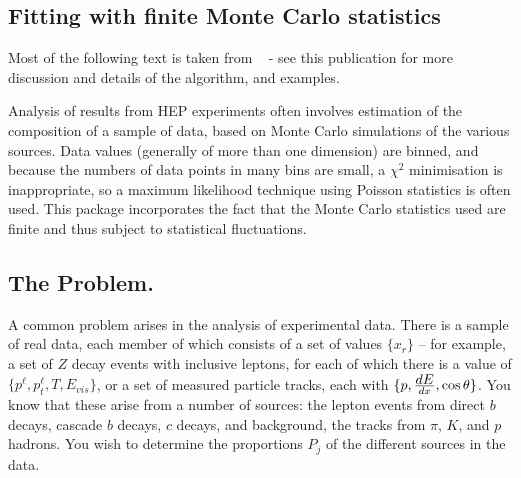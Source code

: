 \begin{changebar}
\section{Fitting with finite Monte Carlo statistics}
 
Most of the following text is taken from ~\cite{bib-FINITEMC} - see this
publication for more discussion and details of the algorithm, and examples.
 
Analysis of results from HEP experiments often involves
estimation of the composition of a sample of data,
based on Monte Carlo simulations of the various sources.
Data values (generally of more than one dimension) are binned, and
because the numbers of data points in many bins are small, a $\chi^2$
minimisation is inappropriate, so a maximum likelihood technique using
Poisson statistics is often used.    This package incorporates
the fact that the Monte Carlo statistics used are finite and thus
subject to statistical fluctuations.
 
\subsection*{The Problem.}
 
A common problem arises in the analysis of experimental
data.   There is a sample of real data, each member of which
consists of a set of values $\{x_r\}$ -- for example, a set of $Z$ decay
events with
inclusive leptons, for each of which there is a value of
$\{p^\ell, p_t^\ell, T, E_{vis}\}$, or a set of measured particle
tracks, each with
$\{p,{\textstyle dE\over dx},\cos\theta\}$.   You know that these arise from
a number of sources: the lepton events  from direct $b$ decays, cascade $b$ decays,
$c$ decays, and background, the tracks from $\pi$, $K$, and $p$ hadrons.
You wish to determine the proportions $P_j$ of the different sources
in the data.
 

\end{changebar}
